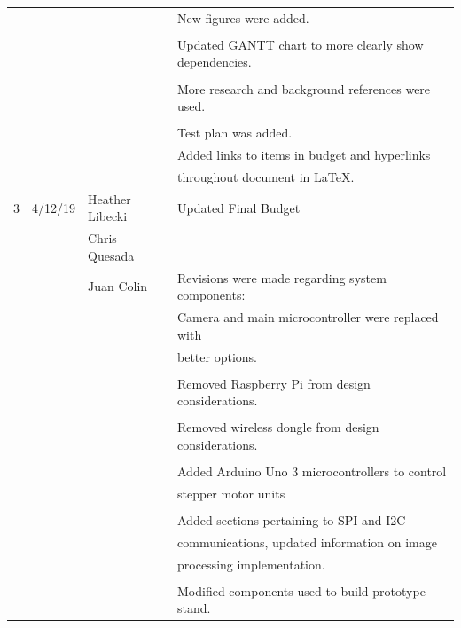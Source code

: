 \begin{table} [H]
\begin{tabular}{|l|l|l|l|}
	      &			 & 				   & New figures were added.\\
	      &			 &				   &	\\
	      &			 &				   & Updated GANTT chart to more clearly show dependencies.\\
	      &			 &				   &	\\
	      &			 &				   & More research and background references were used.\\
	      &			 &				   &	\\
	      &			 &				   & Test plan was added.\\
 	      &			 &				   & Added links to items in budget and hyperlinks \\
 	      &          		 &                 			   & throughout document in LaTeX.\\
 	     	 \hline
 	   3 & 4/12/19  	 & Heather Libecki & Updated Final Budget \\ 
 	      &          		 & Chris Quesada  	 	   & 	\\
 	      &			 & Juan Colin     		   & Revisions were made regarding system components: \\ 
 	      &			 &                 			   & Camera and main microcontroller were replaced with \\
 	      &			 &				   & better options. 	\\
 	      &          		 &               			   & 	\\
 	      &          		 &              			   & Removed Raspberry Pi from design considerations. \\
 	      &         		 &               			   & 	\\
 	      &         		 &             			   & Removed wireless dongle from design considerations. \\
 	      &        		 &              			   & \\
 	      &         		 &            		              & Added Arduino Uno 3 microcontrollers to control \\
 	      &        		 &                			   & stepper motor units \\
 	      &         		 &              			   & \\
 	      &         		 &               			   & Added sections pertaining to SPI and I2C \\
 	      &         		 &              			   & communications, updated information on image \\
 	      &        		 &                 			   &  processing implementation. \\
 	      &         		 &               			   & \\
 	      &         		 &              			   & Modified components used to build prototype stand. \\
		\hline
\end{tabular} 
\end{table} 	      
